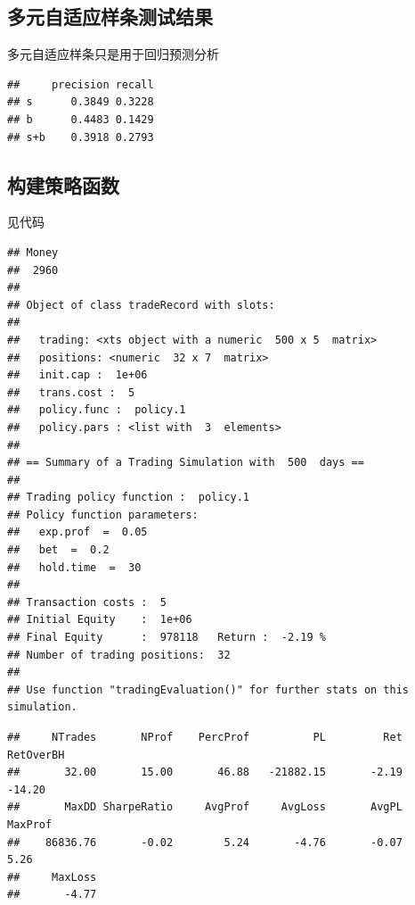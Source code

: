 \documentclass{article}\usepackage[]{graphicx}\usepackage[]{color}
\makeatletter
\newenvironment{kframe}{%
 \def\at@end@of@kframe{}%
 \ifinner\ifhmode%
  \def\at@end@of@kframe{\end{minipage}}%
  \begin{minipage}{\columnwidth}%
 \fi\fi%
 \def\FrameCommand##1{\hskip\@totalleftmargin \hskip-\fboxsep
 \colorbox{shadecolor}{##1}\hskip-\fboxsep
     \hskip-\linewidth \hskip-\@totalleftmargin \hskip\columnwidth}%
 \MakeFramed {\advance\hsize-\width
   \@totalleftmargin\z@ \linewidth\hsize
   \@setminipage}}%
 {\par\unskip\endMakeFramed%
 \at@end@of@kframe}
\newenvironment{knitrout}{}{} %
\makeatother
\begin{document}
\begin{CJK*}{UTF8}{gkai}
\subsection{多元自适应样条测试结果}
多元自适应样条只是用于回归预测分析
\begin{knitrout}
\color{fgcolor}\begin{kframe}
\begin{verbatim}
##     precision recall
## s      0.3849 0.3228
## b      0.4483 0.1429
## s+b    0.3918 0.2793
\end{verbatim}
\end{kframe}
\end{knitrout}
\subsection{构建策略函数}
见代码



\begin{knitrout}
\color{fgcolor}\begin{kframe}
\begin{verbatim}
## Money 
##  2960
## 
## Object of class tradeRecord with slots:
## 
## 	 trading: <xts object with a numeric  500 x 5  matrix>
## 	 positions: <numeric  32 x 7  matrix>
## 	 init.cap :  1e+06 
## 	 trans.cost :  5 
## 	 policy.func :  policy.1 
## 	 policy.pars : <list with  3  elements>
## 
## == Summary of a Trading Simulation with  500  days ==
## 
## Trading policy function :  policy.1 
## Policy function parameters:
## 	 exp.prof  =  0.05 
## 	 bet  =  0.2 
## 	 hold.time  =  30 
## 
## Transaction costs :  5 
## Initial Equity    :  1e+06 
## Final Equity      :  978118   Return :  -2.19 %
## Number of trading positions:  32 
## 
## Use function "tradingEvaluation()" for further stats on this simulation.
\end{verbatim}
\end{kframe}
\end{knitrout}

\begin{knitrout}
\color{fgcolor}\begin{kframe}
\begin{verbatim}
##     NTrades       NProf    PercProf          PL         Ret   RetOverBH 
##       32.00       15.00       46.88   -21882.15       -2.19      -14.20 
##       MaxDD SharpeRatio     AvgProf     AvgLoss       AvgPL     MaxProf 
##    86836.76       -0.02        5.24       -4.76       -0.07        5.26 
##     MaxLoss 
##       -4.77
\end{verbatim}
\end{kframe}
\end{knitrout}


\end{CJK*}
\end{document}
